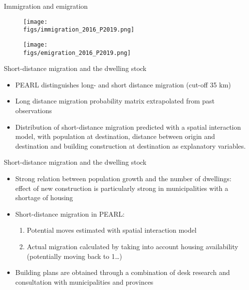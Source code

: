 \documentclass[final, 12pt, aspectratio=169, xcolor={dvipsnames}]{beamer}
\newcommand*{\figs}{../figs}%
\begin{document}
\begin{frame}{Immigration and emigration}
  \noindent
  \begin{minipage}[t]{0.48\linewidth}%
    \begin{figure}
    \texttt{[image: \\figs/immigration\_2016\_P2019.png]}
  \end{figure}

\end{minipage}%
\hfill%
\begin{minipage}[t]{0.48\linewidth}
  \begin{figure}
    \texttt{[image: \\figs/emigration\_2016\_P2019.png]}
  \end{figure}
\end{minipage}
  
  \end{frame}

\begin{frame}{Short-distance migration and the dwelling stock}
\begin{itemize}
    \item PEARL distinguishes long- and short distance migration (cut-off 35 km)
      \item Long distance migration probability matrix extrapolated from past observations
      \item Distribution of short-distance migration predicted with a spatial interaction model, with population at destination, distance between origin and destination and building construction at destination as explanatory variables.
      \end{itemize}
\end{frame}

\begin{frame}{Short-distance migration and the dwelling stock}
  \begin{itemize}
  \item Strong relation between population growth and the number of dwellings: effect of new construction is particularly strong in municipalities with a shortage of housing
  \item Short-distance migration in PEARL:
    \begin{enumerate}
    \item Potential moves estimated with spatial interaction model
    \item Actual migration calculated by taking into account housing availability (potentially moving back to 1…)
    \end{enumerate}
  \item Building plans are obtained through a combination of desk research and consultation with municipalities and provinces
  \end{itemize}
  \href{http://www.pbl.nl/publicaties/pbl-cbs-regionale-bevolkings-en-huishoudensprognose-2016-2040-woningbouwveronderstellingen}{}
\end{frame}
\end{document}
